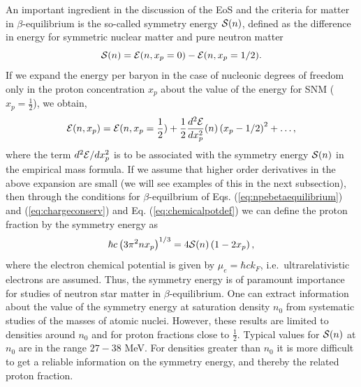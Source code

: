 An important ingredient in the discussion of the EoS and the criteria for
matter in $\beta$-equilibrium is the so-called symmetry energy ${\cal S} (n)$, 
defined as
the difference in energy for symmetric nuclear matter
and pure neutron matter 
\begin{equation}
      {\cal S} (n) = {\cal E} (n,x_p=0) - {\cal E} (n,x_p=1/2 ).
      \label{eq:symenergy}
\end{equation}
If we expand the energy per baryon in the case of nucleonic degrees of freedom 
only
in the proton concentration $x_p$ about the value of the energy 
for SNM ($x_p=\frac{1}{2}$), we obtain,
\begin{equation}
     {\cal E} (n,x_p)={\cal E} (n,x_p=\frac{1}{2})+
     \frac{1}{2}\frac{d^2 {\cal E}}{dx_p^2} (n)\left(x_p-1/2\right)^2+\dots ,
     \label{eq:energyexpansion}
\end{equation}
where the term $d^2 {\cal E}/dx_p^2$ 
is to be associated with the symmetry energy ${\cal S} (n)$ in the empirical
mass formula. If
we assume that higher order derivatives in the above expansion are small
(we will see examples of this in the next subsection), then through the 
conditions
for $\beta$-equilbrium of Eqs. (\ref{eq:npebetaequilibrium}) and 
(\ref{eq:chargeconserv})
and Eq. (\ref{eq:chemicalpotdef}) we can define the proton
fraction by the symmetry energy as
\begin{equation}  
    \hbar c\left(3\pi^2nx_p\right)^{1/3} = 4{\cal S} (n)\left(1-2x_p\right),
    \label{eq:crudeprotonfraction}
\end{equation}
where the electron chemical potential is given
by $\mu_e = \hbar c k_F$, i.e.\  ultrarelativistic electrons are assumed.
Thus, the symmetry energy is of paramount importance for studies 
of neutron star matter in $\beta$-equilibrium.
One can extract information about the value of the symmetry energy at saturation 
density
$n_0$ from systematic studies of the masses of atomic nuclei. However, these 
results
are limited to densities around $n_0$ and for proton fractions close to 
$\frac{1}{2}$.
Typical values for ${\cal S} (n)$ at $n_0$ are in the range $27-38$ MeV.
For densities greater than $n_0$ it is more difficult to get a reliable 
information on the symmetry energy, and thereby the related proton fraction.






